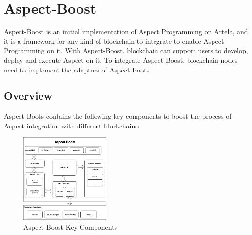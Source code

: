 \section{Aspect-Boost}
Aspect-Boost is an initial implementation of Aspect Programming on Artela, and it is a framework for any kind of blockchain to integrate to enable Aspect Programming on it. With Aspect-Boost, blockchain can support users to develop, deploy and execute Aspect on it. To integrate Aspect-Boost, blockchain nodes need to implement the adaptors of Aspect-Boots.

\subsection{Overview}

Aspect-Boots contains the following key components to boost the process of Aspect integration with different blockchains:

\begin{figure}[h]
  \centering
  \includegraphics[width=0.4\textwidth]{sections/aspect-boost.png}
  \caption{Aspect-Boost Key Components}
\end{figure}

